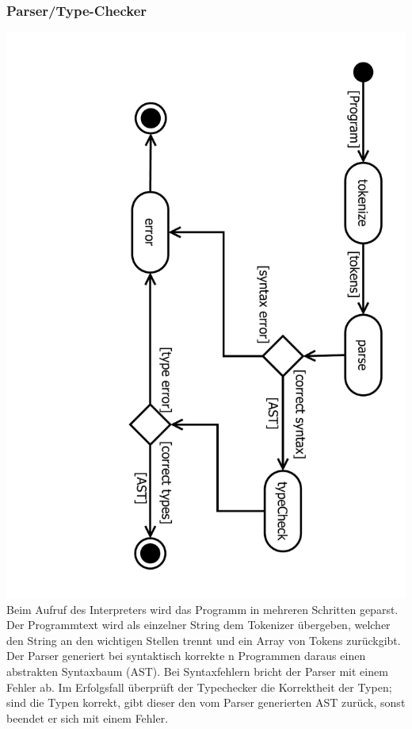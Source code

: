 \documentclass[10pt,a4paper,titlepage]{article}
\begin{document}
\subsubsection{Parser/Type-Checker}
\includegraphics[angle=90, scale=0.45]{images/AktivitaetParser.pdf}\newline
Beim Aufruf des Interpreters wird das Programm in mehreren Schritten geparst.\newline
Der Programmtext wird als einzelner String dem Tokenizer übergeben, welcher den String an den wichtigen Stellen trennt und ein Array von Tokens zurückgibt. Der Parser generiert bei syntaktisch korrekte n Programmen daraus einen abstrakten Syntaxbaum (AST). Bei Syntaxfehlern bricht der Parser mit einem Fehler ab.\newline
Im Erfolgsfall überprüft der Typechecker die Korrektheit der Typen; sind die Typen korrekt, gibt dieser den vom Parser generierten AST zurück, sonst beendet er sich mit einem Fehler.
\end{document}
